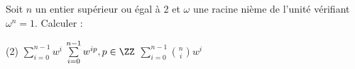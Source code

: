 %
%
	Soit $n$ un entier supérieur ou égal à 2 et $\omega$ une racine nième de l'unité vérifiant $\omega^n=1$. Calculer :
	\begin{tasks}(2)
		\task  $\sum\limits_{i=0}^{n-1} w^i$
		\task $\sum\limits_{i=0}^{n-1} w^{ip}, p\in \ZZ$
		\task $\sum\limits_{i=0}^{n-1} \binom{n}{i} w^{i}$
		\end{tasks}
